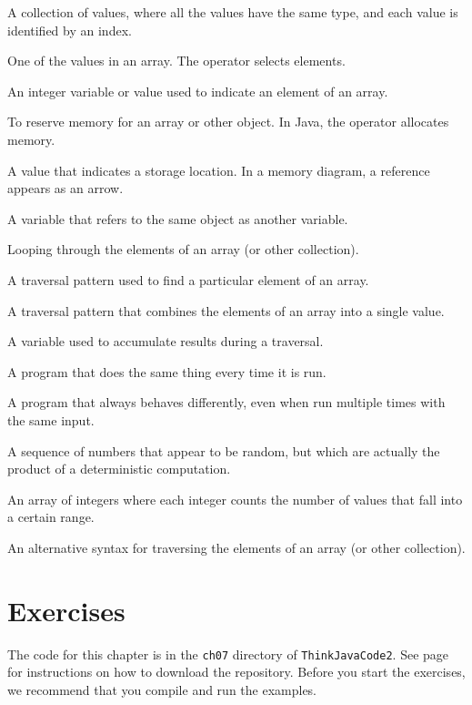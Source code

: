 \begin{description}

A collection of values, where all the values have the same type, and each value is identified by an index.

One of the values in an array.
The \java{[]} operator selects elements.

An integer variable or value used to indicate an element of an array.

To reserve memory for an array or other object.
In Java, the  operator allocates memory.

A value that indicates a storage location.
In a memory diagram, a reference appears as an arrow.

A variable that refers to the same object as another variable.

Looping through the elements of an array (or other collection).

A traversal pattern used to find a particular element of an array.

A traversal pattern that combines the elements of an array into a single value.

A variable used to accumulate results during a traversal.

A program that does the same thing every time it is run.

A program that always behaves differently, even when run multiple times with the same input.

A sequence of numbers that appear to be random, but which are actually the product of a deterministic computation.

An array of integers where each integer counts the number of values that fall into a certain range.

An alternative syntax for traversing the elements of an array (or other collection).

\end{description}


\section{Exercises}

The code for this chapter is in the {\tt ch07} directory of {\tt ThinkJavaCode2}.
See page~\pageref{code} for instructions on how to download the repository.
Before you start the exercises, we recommend that you compile and run the examples.

